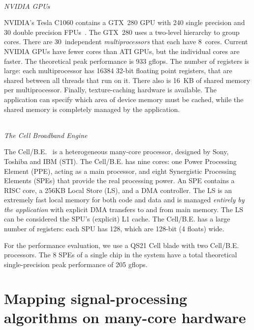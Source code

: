 \documentclass{article}
\newcommand{\longversion}[1]{}
\begin{document}
\noindent \\ \emph{NVIDIA GPUs}

\noindent NVIDIA's Tesla C1060 contains a GTX~280 GPU with 240 single
precision and 30 double precision FPUs~\cite{cuda-manual}. The GTX~280
uses a two-level hierarchy to group cores.  There are 30~independent
\emph{multiprocessors\/} that each have 8~cores.  Current NVIDIA GPUs
have fewer cores than ATI GPUs, but the individual cores are faster.
The theoretical peak performance is 933 gflops.  The number of
registers is large: each multiprocessor has 16384 32-bit floating point registers,
that are shared between all threads that run on it.
There also is 16~KB of shared memory per
multiprocessor.  Finally, texture-caching hardware
is available.  The application can specify which area of device memory
must be cached, while the shared memory is completely managed by the
application.



\noindent \\ \emph{The Cell Broadband Engine}

\noindent The \mbox{Cell/B.E.}~\cite{cell} is a
heterogeneous many-core processor, designed by Sony, Toshiba and IBM
(STI).  The \mbox{Cell/B.E.} has nine cores: one Power Processing
Element (PPE), acting as a main processor, and eight Synergistic
Processing Elements (SPEs) that provide the real processing power.
An SPE contains
a RISC core, a 256KB Local Store (LS), and a DMA controller.
The LS is an extremely fast local memory for both code and data
and is managed \emph{entirely by the application} with explicit DMA
transfers to and from main memory.  The LS can be considered the SPU's (explicit) L1 cache.  The
\mbox{Cell/B.E.} has a large number of registers: each SPU has 128,
which are 128-bit (4 floats) wide.
\longversion{
 The SPU can dispatch two
instructions in each clock cycle using the two pipelines designated
\emph{even} and \emph{odd}. Most of the arithmetic instructions
execute on the even pipe, while most of the memory instructions
execute on the odd pipe. 
}
For the performance evaluation, we use a QS21 Cell blade with two
\mbox{Cell/B.E.} processors.
The 8 SPEs of a single chip in the
system have a total theoretical single-precision peak performance of
205 gflops.


\section{Mapping signal-processing algorithms on many-core hardware}
\end{document}
